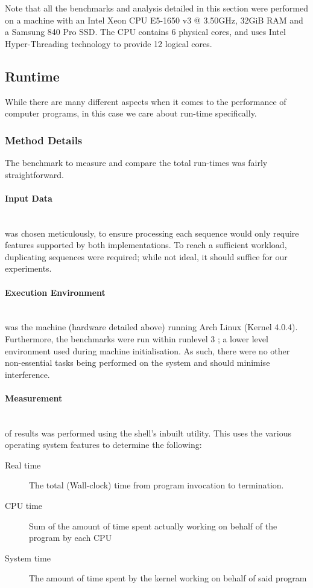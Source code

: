 Note that all the benchmarks and analysis detailed in this section were performed on a machine with an Intel\textsuperscript{\textregistered} Xeon\textsuperscript{\textregistered} CPU E5-1650 v3 @ 3.50GHz, 32GiB RAM and a Samsung\textsuperscript{\textregistered} 840 Pro SSD. The CPU contains 6 physical cores, and uses Intel\textsuperscript{\textregistered} Hyper-Threading technology to provide 12 logical cores.

\subsection{Runtime}
While there are many different aspects when it comes to the performance of computer programs, in this case we care about run-time specifically. 

\subsubsection{Method Details}

The benchmark to measure and compare the total run-times was fairly straightforward.

\paragraph{Input Data} \hfill \\
was chosen meticulously, to ensure processing each sequence would only require features supported by both implementations. To reach a sufficient workload, duplicating sequences were required; while not ideal, it should suffice for our experiments.

\paragraph{Execution Environment} \hfill \\
was the machine (hardware detailed above) running Arch Linux (Kernel 4.0.4). Furthermore, the benchmarks were run within runlevel 3 \autocite{runlevels}; a lower level environment used during machine initialisation. As such, there were no other non-essential tasks being performed on the system and should minimise interference.

\paragraph{Measurement} \hfill \\
of results was performed using the shell's inbuilt  utility. This uses the various operating system features to determine the following:
\begin{description}
	\item[Real time] The total (Wall-clock) time from program invocation to termination.
	\item[CPU time] Sum of the amount of time spent actually working on behalf of the program by each CPU
	\item[System time] The amount of time spent by the kernel working on behalf of said program
\end{description}

